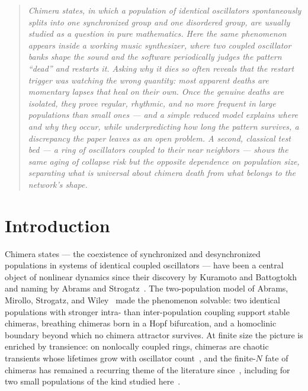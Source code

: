 \documentclass[pdflatex,sn-mathphys,Numbered]{sn-jnl}
\begin{document}

\maketitle

\begin{quote}\itshape
Chimera states, in which a population of identical oscillators
spontaneously splits into one synchronized group and one disordered group, are
usually studied as a question in pure mathematics. Here the same phenomenon appears
inside a working music synthesizer, where two coupled oscillator banks shape the
sound and the software periodically judges the pattern ``dead'' and restarts it.
Asking why it dies so often reveals that the restart trigger was watching the wrong
quantity: most apparent deaths are momentary lapses that heal on their own. Once the
genuine deaths are isolated, they prove regular, rhythmic, and no more frequent in
large populations than small ones --- and a simple reduced model explains where and
why they occur, while underpredicting how long the pattern survives, a discrepancy
the paper leaves as an open problem. A second, classical test bed --- a ring of
oscillators coupled to their near neighbors --- shows the same aging of collapse
risk but the opposite dependence on population size, separating what is universal
about chimera death from what belongs to the network's shape.
\end{quote}

\section{Introduction}\label{sec:intro}

Chimera states --- the coexistence of synchronized and desynchronized populations in
systems of identical coupled oscillators --- have been a central object of nonlinear
dynamics since their discovery by Kuramoto and Battogtokh~\cite{kb2002} and naming by
Abrams and Strogatz~\cite{as2004}. The two-population model of Abrams, Mirollo,
Strogatz, and Wiley~\cite{abrams2008} made the phenomenon solvable: two identical
populations with stronger intra- than inter-population coupling support stable
chimeras, breathing chimeras born in a Hopf bifurcation, and a homoclinic boundary
beyond which no chimera attractor survives. At finite size the picture is enriched by
transience: on nonlocally coupled rings, chimeras are chaotic transients whose
lifetimes grow with oscillator count~\cite{wo2011}, and the finite-$N$ fate of
chimeras has remained a recurring theme of the literature
since~\cite{pa2015,om2018}, including for two small populations of the kind
studied here~\cite{panaggio2016}.
\end{document}
